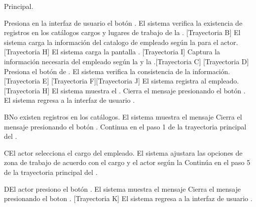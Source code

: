 \begin{UCtrayectoria}{Principal.}
	
	\UCpaso[\UCactor] Presiona en la interfaz de usuario  el botón \IUbutton{+}.
	\UCpaso  El sistema verifica la existencia de registros en los catálogos cargos  y  lugares de trabajo de la  . [Trayectoria B] 
	\UCpaso El sistema carga la información del catalogo de empleado  según la  para el actor. [Trayectoria H]
	\UCpaso El sistema carga la pantalla  . [Trayectoria I]
	\UCpaso[\UCactor] Captura la información necesaria del empleado según la  y la .[Trayectoria C] [Trayectoria D] 
	\UCpaso[\UCactor]  Presiona el botón de .
	\UCpaso El sistema verifica la consistencia de la información. [Trayectoria E] [Trayectoria F][Trayectoria J]
	\UCpaso El sistema registra al empleado. [Trayectoria H]
	\UCpaso  El sistema muestra el .    
	\UCpaso[\UCactor] Cierra el mensaje presionando el botón .
	\UCpaso El sistema regresa a la interfaz de usuario .
\end{UCtrayectoria}


\begin{UCtrayectoriaA}{B}{No existen registros en los catálogos.}
	\UCpaso El sistema muestra el mensaje 
	\UCpaso[\UCactor] Cierra el mensaje presionando el botón .
	\UCpaso Continua en el paso 1 de la trayectoria principal del .
\end{UCtrayectoriaA}

\begin{UCtrayectoriaA}{C}{El actor selecciona el cargo del empleado.}
	\UCpaso     El sistema ajustara las opciones de zona de trabajo de acuerdo con el cargo y el actor según la 
	\UCpaso Continúa en el paso 5 de la trayectoria principal del .
\end{UCtrayectoriaA}

\begin{UCtrayectoriaA}{D}{El actor presiono el botón .}
	\UCpaso El sistema muestra el mensaje 
	\UCpaso[\UCactor] Cierra el mensaje presionando el boton . [Trayectoria K]
	\UCpaso El sistema regresa a la interfaz de usuario .
\end{UCtrayectoriaA}

